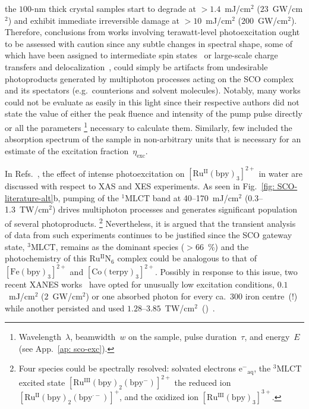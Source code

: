 the $100$-nm thick crystal samples start to degrade
at $> 1.4$~mJ/cm$^2$ ($23$~GW/cm$^2$) and exhibit immediate irreversible damage
at $> 10$~mJ/cm$^2$ ($200$~GW/cm$^2$).
%
Therefore, conclusions from works involving terawatt-level photoexcitation
ought to be assessed with caution since any subtle changes in spectral shape,
some of which have been assigned to intermediate spin states~\cite{Zhang2014} or
large-scale charge transfers and delocalization~\cite{Freyer2013},
could simply be artifacts from undesirable photoproducts generated by multiphoton processes acting
on the SCO complex and its spectators (e.g.~counterions and solvent molecules).
%
Notably, many works could not be evaluate as easily in this light
since their respective authors did not state the value of either the peak fluence
and intensity of the pump pulse directly or all the parameters%
\footnote{Wavelength~$\lambda$, beamwidth~$w$ on the sample, pulse duration~$\tau$,
and energy~$E$ (see App.~\ref{ap: sco-exc}).} necessary to calculate them.
%
Similarly, few included the absorption spectrum of the sample in non-arbitrary units
that is necessary for an estimate of the excitation fraction~$\eta_\text{exc}$.

In Refs.~\cite{Tarnovsky2006, Haldrup2016, Biasin2016},
the effect of intense photoexcitation on $\mathrm{[Ru^{II}(bpy)_3]^{2+}}$ in water
are discussed with respect to XAS and XES experiments.
%
As seen in Fig.~\ref{fig: SCO-literature-alt}b,
pumping of the $\mathrm{^1 MLCT}$ band at 40--170~mJ/cm$^2$ (0.3--1.3~TW/cm$^2$)
drives multiphoton processes and generates significant population of several photoproducts.%
\footnote{Four species could be spectrally resolved:
solvated electrons $\mathrm{e^-}_\text{aq}$,
the $\mathrm{^3 MLCT}$ excited state $\mathrm{[Ru^{III}(bpy)_2(bpy^{-})]^{2+}}$
the reduced ion $\mathrm{[Ru^{II}(bpy)_2(bpy^{\cdot -})]^+}$,
and the oxidized ion $\mathrm{[Ru^{III}(bpy)_3]^{3+}}$.}
Nevertheless, it is argued that the transient analysis of data from such experiments
continues to be justified since the SCO gateway state, $\mathrm{^3 MLCT}$,
remains as the dominant species ($> 66$~\%) and
the photochemistry of this $\mathrm{Ru^{II}N_6}$ complex could be analogous to
that of $\mathrm{[Fe(bpy)_3]^{2+}}$ and $\mathrm{[Co(terpy)_3]^{2+}}$.
%
Possibly in response to this issue,
two recent XANES works~\cite{Zhang2017, Kjaer2017} have opted for
unusually low excitation conditions, $0.1$~mJ/cm$^2$ ($2$~GW/cm$^2$)
or one absorbed photon for every ca.~300 iron centre~(!)
while another persisted and used $1.28$--$3.85$~TW/cm$^2$~(\textinterrobang)~\cite{Kong2019}.


